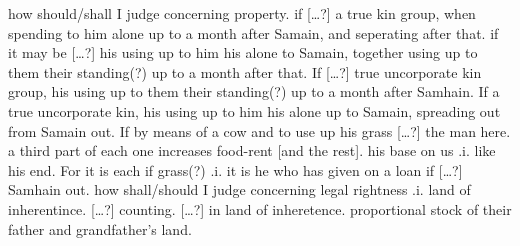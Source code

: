 \documentclass[11pt]{article}
\begin{document}
\begin{pages}
\begin{Rightside}
    \beginnumbering\pstart
    how should/shall I judge concerning property. if [\ldots?] a true kin group, when spending to him alone up to a month after Samain, and seperating after that. if it may be [\ldots?] his using up to him his alone to Samain, together using up to them their standing(?) up to a month after that.  If [\ldots?] true uncorporate kin group, his using up to them their standing(?) up to a month after Samhain.  If a true uncorporate kin, his using up to him his alone up to Samain, spreading out from Samain out.  If by means of a cow and to use up his grass [\ldots?] the man here.  a third part of each one increases food-rent [and the rest].\hspace{2mm} his base on us .i. like his end. For it is each if grass(?) .i. it is he who has given on a loan if [\ldots?] Samhain out.  how shall/should I judge concerning legal rightness .i. land of inherentince.  [\ldots?] counting.  [\ldots?] in land of inheretence.  proportional stock of their father and grandfather's land.  
    \pend
    \endnumbering
  \end{Rightside}

  \Pages
\end{pages}
\end{document}
